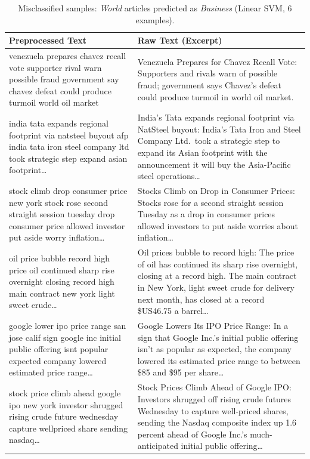 \begin{table}[htbp]
\centering
\caption{Misclassified samples: \textit{World} articles predicted as \textit{Business} (Linear SVM, 6 examples).}
\label{tab:linsvm-world-biz}
\small
\begin{tabular}{p{0.6\textheight} p{0.6\textheight}}
\toprule
\textbf{Preprocessed Text} & \textbf{Raw Text (Excerpt)} \\
\midrule
venezuela prepares chavez recall vote supporter rival warn possible fraud government say chavez defeat could produce turmoil world oil market &
Venezuela Prepares for Chavez Recall Vote: Supporters and rivals warn of possible fraud; government says Chavez's defeat could produce turmoil in world oil market. \\
\addlinespace
india tata expands regional footprint via natsteel buyout afp india tata iron steel company ltd took strategic step expand asian footprint\ldots &
India's Tata expands regional footprint via NatSteel buyout: India's Tata Iron and Steel Company Ltd.\ took a strategic step to expand its Asian footprint with the announcement it will buy the Asia-Pacific steel operations\ldots \\
\addlinespace
stock climb drop consumer price new york stock rose second straight session tuesday drop consumer price allowed investor put aside worry inflation\ldots &
Stocks Climb on Drop in Consumer Prices: Stocks rose for a second straight session Tuesday as a drop in consumer prices allowed investors to put aside worries about inflation\ldots \\
\addlinespace
oil price bubble record high price oil continued sharp rise overnight closing record high main contract new york light sweet crude\ldots &
Oil prices bubble to record high: The price of oil has continued its sharp rise overnight, closing at a record high. The main contract in New York, light sweet crude for delivery next month, has closed at a record \$US46.75 a barrel\ldots \\
\addlinespace
google lower ipo price range san jose calif sign google inc initial public offering isnt popular expected company lowered estimated price range\ldots &
Google Lowers Its IPO Price Range: In a sign that Google Inc.'s initial public offering isn't as popular as expected, the company lowered its estimated price range to between \$85 and \$95 per share\ldots \\
\addlinespace
stock price climb ahead google ipo new york investor shrugged rising crude future wednesday capture wellpriced share sending nasdaq\ldots &
Stock Prices Climb Ahead of Google IPO: Investors shrugged off rising crude futures Wednesday to capture well-priced shares, sending the Nasdaq composite index up 1.6 percent ahead of Google Inc.'s much-anticipated initial public offering\ldots \\
\bottomrule
\end{tabular}
\end{table}

